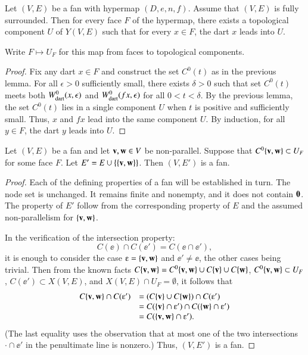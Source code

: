 \begin{lemma} \label{lemma:UF}
Let $(V,E)$ be a fan with hypermap $(D,e,n,f)$.  Assume that $(V,E)$
is fully surrounded.  Then for every face $F$ of the hypermap, there
exists a topological component $U$ of $Y(V,E)$ such that for every
$x\in F$, the dart $x$ leads into $U$.
\end{lemma}
%
%
%

Write $F\mapsto U_F$ for this map from faces to topological components.
%

\begin{proof} Fix any dart $x\in F$ and construct the set $C^0(t)$ as
in the previous lemma.  For all $\epsilon>0$ sufficiently small,
there exists $\delta>0$ such that set $C^0(t)$ meets both
$W^0_{\text{dart}}(x,\epsilon)$ and $W^0_{\text{dart}}(f x,\epsilon)$ for all
$0<t<\delta$.  By the previous lemma, the set $C^0(t)$ lies in a
single component $U$ when $t$ is positive and sufficiently small.
Thus, $x$ and $f x$ lead into the same component $U$.  By induction,
for all $y\in F$, the dart $y$ leads into $U$.
\end{proof}

\begin{lemma}\label{lemma:add-edge}
Let $(V,E)$ be a fan and let ${\mathbf v},{\mathbf w}\in V$ be non-parallel.  Suppose
that $C^0\{{\mathbf v},{\mathbf w}\}\subset U_F$ for some face $F$.  Let $E' =
E\cup\{\{{\mathbf v},{\mathbf w}\}\}$.  Then $(V,E')$ is a fan.
\end{lemma}

\begin{proof} Each of the defining properties of a fan will be
established in turn.  The node set is unchanged.  It remains finite
and nonempty, and it does not contain ${\mathbf 0}$.  The property
 of $E'$ follow from the corresponding property
of $E$ and the assumed non-parallelism for $\{{\mathbf v},{\mathbf w}\}$.

In the verification of the intersection property:
\begin{displaymath}
C(\ee)\cap C(\ee') = C(\ee \cap \ee'),
\end{displaymath}
it is enough to consider the case $\ee = \{\v,\w\}$ and $\ee' \ne
\ee$, the other cases being trivial.  Then from the known facts
$C\{{\mathbf v},{\mathbf w}\} = C^0\{{\mathbf v},{\mathbf w}\}\cup C\{{\mathbf v}\}\cup C\{{\mathbf w}\}$,
$C^0\{{\mathbf v},{\mathbf w}\}\subset U_F$, $C(\ee')\subset X(V,E)$, and $X(V,E)\cap
U_F=\emptyset$, it follows that
\begin{displaymath}
\begin{array}{rll}
C\{\v,\w\} \cap C(\ee')  &= (C\{\v\} \cup C\{\w\}) \cap C(\ee') \\
&= C(\{\v\}\cap \ee') \cap C(\{\w\}\cap \ee')\\
&= C(\{\v,\w\}\cap \ee').
\end{array}
\end{displaymath}
(The last equality uses the observation that at most one of the two
intersections $\cdot\cap\ee'$ in the penultimate line is nonzero.)
Thus, $(V,E')$ is a fan.
\end{proof}


